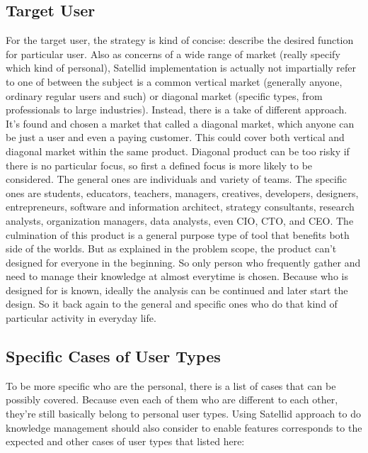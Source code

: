 \subsection{Target User}

For the target user, the strategy is kind of concise: describe the desired function for particular user.
Also as concerns of a wide range of market (really specify which kind of personal), Satellid implementation is actually not impartially refer to one of between the subject is a common vertical market (generally anyone, ordinary regular users and such) or diagonal market (specific types, from professionals to large industries).
Instead, there is a take of different approach.
It's found and chosen a market that called a diagonal market, which anyone can be just a user and even a paying customer.
This could cover both vertical and diagonal market within the same product.
Diagonal product can be too risky if there is no particular focus, so first a defined focus is more likely to be considered.
The general ones are individuals and variety of teams.
The specific ones are students, educators, teachers, managers, creatives, developers, designers, entrepreneurs, software and information architect, strategy consultants, research analysts, organization managers, data analysts, even \ac{CIO}, \ac{CTO}, and \ac{CEO}.
The culmination of this product is a general purpose type of tool that benefits both side of the worlds.
But as explained in the problem scope, the product can't designed for everyone in the beginning.
So only person who frequently gather and need to manage their knowledge at almost everytime is chosen.
Because who is designed for is known, ideally the analysis can be continued and later start the design.
So it back again to the general and specific ones who do that kind of particular activity in everyday life.

\subsection{Specific Cases of User Types}

To be more specific who are the personal, there is a list of cases that can be possibly covered.
Because even each of them who are different to each other, they're still basically belong to personal user types.
Using Satellid approach to do knowledge management should also consider to enable features corresponds to the expected and other cases of user types that listed here:

